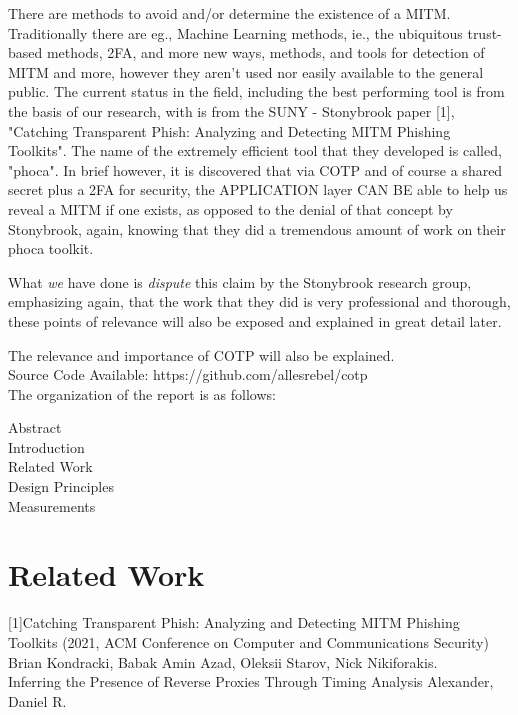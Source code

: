 \documentclass[a4paper, 11pt]{article} 				%
\begin{document}
There are methods to avoid and/or determine the existence of a MITM. Traditionally there are eg., Machine Learning methods, ie., the ubiquitous trust-based methods, 2FA, and more new ways, methods, and tools for detection of MITM and more, however they aren't used nor easily available to the general public.
The current status in the field, including the best performing tool is from the basis of our research, with is from the SUNY - Stonybrook paper [1], "Catching Transparent Phish: Analyzing and Detecting MITM  Phishing Toolkits". The name of the extremely efficient tool that they developed is called, "phoca". In brief however, it is discovered that via COTP and of course a shared secret plus a 2FA for security, the APPLICATION layer CAN BE able to help us reveal a MITM if one exists, as opposed to the denial of that concept by Stonybrook, again, knowing that they did a tremendous amount of work on their phoca toolkit. 

What \textit{we} have done is \textit{dispute} this claim by the Stonybrook research group, emphasizing again, that the work that they did is very professional and thorough, these points of relevance will also be exposed and explained in great detail later. 

\noindent
The relevance and importance of COTP will also be explained.\\

\noindent
Source Code Available: https://github.com/allesrebel/cotp\\
The organization of the report is as follows:

\noindent
Abstract\\
Introduction\\
Related Work\\
Design Principles\\
Measurements\\



\section{Related Work}
[1]Catching Transparent Phish: Analyzing and Detecting MITM Phishing Toolkits (2021, ACM Conference on Computer and Communications Security)
Brian Kondracki, Babak Amin Azad, Oleksii Starov, Nick Nikiforakis.\\

\noindent
[18]Inferring the Presence of Reverse Proxies Through Timing Analysis
Alexander, Daniel R.\\
\end{document}
